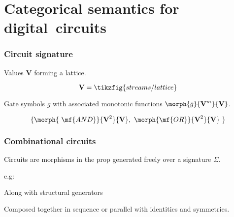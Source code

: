 \section{Categorical semantics for digital~circuits}

\begin{frame}
    \frametitle{Circuit signature}

    \pause

    \alert{Values} $\textbf{V}$ forming a lattice.

    \pause

    \[\textbf{V} = \tikzfig{streams/lattice}\]

    \pause

    \alert{Gate symbols} $g$ with associated monotonic functions $\morph{\bar{g}}{\textbf{V}^m}{\textbf{V}}$.

    \pause

    \[\{\morph{\ \mf{AND}}{\textbf{V}^2}{\textbf{V}},\ \morph{\mf{OR}}{\textbf{V}^2}{\textbf{V}}\ \}\]

\end{frame}

\begin{frame}
    \frametitle{Combinational circuits}

    \pause

    Circuits are \alert{morphisms} in the prop generated freely over a signature $\Sigma$.

    \pause

    e.g:

    \begin{center}

        \pause

        \vspace{1em}

    \end{center}

    \vspace{1em}

    \pause

    Along with \alert{structural} generators 

    \begin{center}
        \quad
        \quad
    \end{center}

    \pause

    Composed together in sequence or parallel with identities and symmetries.

\end{frame}

